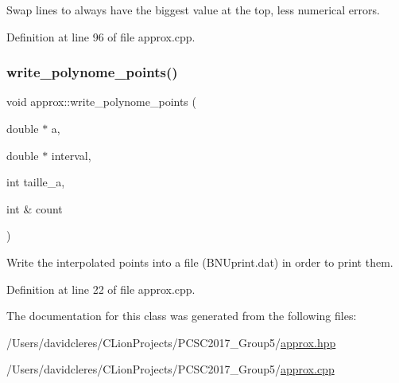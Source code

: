Swap lines to always have the biggest value at the top, less numerical errors. 



Definition at line 96 of file approx.\+cpp.

\mbox{\label{classapprox_a342792f126728ac2ffecae1599420946}} 
\subsubsection{\texorpdfstring{write\+\_\+polynome\+\_\+points()}{write\_polynome\_points()}}
{\footnotesize\ttfamily void approx\+::write\+\_\+polynome\+\_\+points (\begin{DoxyParamCaption}\item[{double $\ast$}]{a,  }\item[{double $\ast$}]{interval,  }\item[{int}]{taille\+\_\+a,  }\item[{int \&}]{count }\end{DoxyParamCaption})}



Write the interpolated points into a file (B\+N\+Uprint.\+dat) in order to print them. 



Definition at line 22 of file approx.\+cpp.



The documentation for this class was generated from the following files\+:\begin{DoxyCompactItemize}
\item 
/\+Users/davidcleres/\+C\+Lion\+Projects/\+P\+C\+S\+C2017\+\_\+\+Group5/\mbox{\hyperlink{approx_8hpp}{approx.\+hpp}}\item 
/\+Users/davidcleres/\+C\+Lion\+Projects/\+P\+C\+S\+C2017\+\_\+\+Group5/\mbox{\hyperlink{approx_8cpp}{approx.\+cpp}}\end{DoxyCompactItemize}
